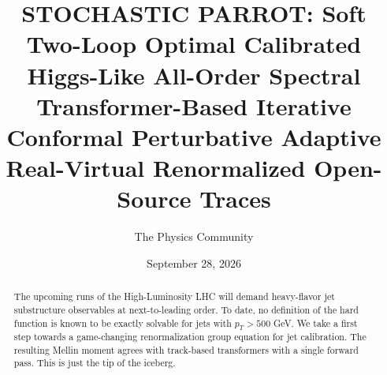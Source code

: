 \documentclass[11pt]{article}
\title{STOCHASTIC PARROT: Soft Two-Loop Optimal Calibrated Higgs-Like All-Order Spectral Transformer-Based Iterative Conformal Perturbative Adaptive Real-Virtual Renormalized Open-Source Traces}
\author{The Physics Community}
\date{September 28, 2026}
\numberwithin{equation}{section}
\theoremstyle{definition}
\theoremstyle{remark}
\begin{document}
\maketitle
\begin{abstract}
The upcoming runs of the High-Luminosity LHC will demand heavy-flavor
jet substructure observables at next-to-leading order. To date, no
definition of the hard function is known to be exactly solvable for jets
with $p_T > 500$ GeV. We take a first step towards a game-changing
renormalization group equation for jet calibration. The resulting Mellin
moment agrees with track-based transformers with a single forward pass.
This is just the tip of the iceberg.
\end{abstract}
\tableofcontents





\nocite{*}


\end{document}
